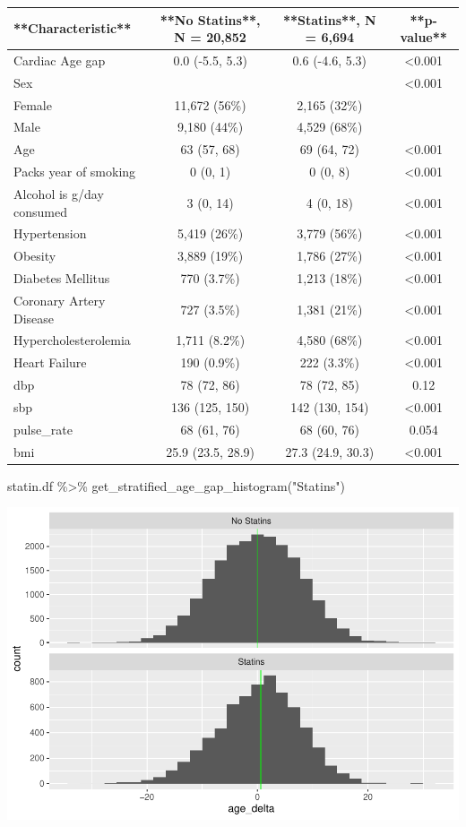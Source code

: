 \documentclass[
]{article}
\newenvironment{Shaded}{\begin{snugshade}}{\end{snugshade}}
\newcommand{\FunctionTok}[1]{\textcolor[rgb]{0.00,0.00,0.00}{#1}}
\newcommand{\NormalTok}[1]{#1}
\newcommand{\SpecialCharTok}[1]{\textcolor[rgb]{0.00,0.00,0.00}{#1}}
\newcommand{\StringTok}[1]{\textcolor[rgb]{0.31,0.60,0.02}{#1}}
\begin{document}
\begin{tabular}{l|c|c|c}
\hline
**Characteristic** & **No Statins**, N = 20,852 & **Statins**, N = 6,694 & **p-value**\\
\hline
Cardiac Age gap & 0.0 (-5.5, 5.3) & 0.6 (-4.6, 5.3) & <0.001\\
\hline
Sex &  &  & <0.001\\
\hline
Female & 11,672 (56\%) & 2,165 (32\%) & \\
\hline
Male & 9,180 (44\%) & 4,529 (68\%) & \\
\hline
Age & 63 (57, 68) & 69 (64, 72) & <0.001\\
\hline
Packs year of smoking & 0 (0, 1) & 0 (0, 8) & <0.001\\
\hline
Alcohol is g/day consumed & 3 (0, 14) & 4 (0, 18) & <0.001\\
\hline
Hypertension & 5,419 (26\%) & 3,779 (56\%) & <0.001\\
\hline
Obesity & 3,889 (19\%) & 1,786 (27\%) & <0.001\\
\hline
Diabetes Mellitus & 770 (3.7\%) & 1,213 (18\%) & <0.001\\
\hline
Coronary Artery Disease & 727 (3.5\%) & 1,381 (21\%) & <0.001\\
\hline
Hypercholesterolemia & 1,711 (8.2\%) & 4,580 (68\%) & <0.001\\
\hline
Heart Failure & 190 (0.9\%) & 222 (3.3\%) & <0.001\\
\hline
dbp & 78 (72, 86) & 78 (72, 85) & 0.12\\
\hline
sbp & 136 (125, 150) & 142 (130, 154) & <0.001\\
\hline
pulse\_rate & 68 (61, 76) & 68 (60, 76) & 0.054\\
\hline
bmi & 25.9 (23.5, 28.9) & 27.3 (24.9, 30.3) & <0.001\\
\hline
\end{tabular}

\begin{Shaded}
\begin{Highlighting}[]
\NormalTok{statin.df }\SpecialCharTok{\%\textgreater{}\%} 
  \FunctionTok{get\_stratified\_age\_gap\_histogram}\NormalTok{(}\StringTok{"Statins"}\NormalTok{)}
\end{Highlighting}
\end{Shaded}

\includegraphics{../results/report_files/figure-latex/statin-age-gap-histograms-1.pdf}
\end{document}

